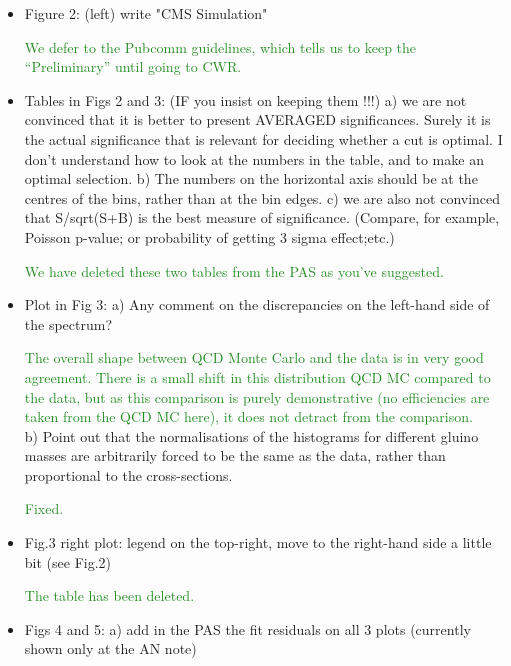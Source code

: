 \documentclass[paper=a4, fontsize=11pt]{scrartcl}
\begin{document}
\begin{itemize}
\item Figure 2: 
(left) write "CMS Simulation" 

\textcolor{ForestGreen}{We defer to the Pubcomm guidelines, which tells us to keep the ``Preliminary'' until
going to CWR.}\\


\item Tables in Figs 2 and 3: (IF you insist on keeping them !!!) 
a) we are not convinced that it is better to present AVERAGED significances. 
Surely it is the actual significance that is relevant for deciding whether 
a cut is optimal. I don't understand how to look at the numbers in the table, 
and to make an optimal selection. 
b) The numbers on the horizontal axis should be at the centres of the bins, 
rather than at the bin edges. 
c) we are also not convinced that S/sqrt(S+B) is the best measure of 
significance. (Compare, for example, Poisson p-value; or probability of 
getting 3 sigma effect;etc.) 

\textcolor{ForestGreen}{We have deleted these two tables from the PAS as you've suggested.}\\


\item Plot in Fig 3: 
a) Any comment on the discrepancies on the left-hand side of the spectrum? 

\textcolor{ForestGreen}{The overall shape between QCD Monte Carlo and the
data is in very good agreement. There is a small shift in this distribution
QCD MC compared to the data, but as this comparison is purely demonstrative
(no efficiencies are taken from the QCD MC here), it does not detract from
the comparison.}\\


b) Point out that the normalisations of the histograms for different gluino 
masses are arbitrarily forced to be the same as the data, rather than 
proportional to the cross-sections. 

\textcolor{ForestGreen}{Fixed.}\\


\item Fig.3 
right plot: legend on the top-right, move to the right-hand side a little 
bit (see Fig.2) 

\textcolor{ForestGreen}{The table has been deleted.}\\


\item Figs 4 and 5: 
a) add in the PAS the fit residuals on all 3 plots (currently shown only at 
the AN note) 


\end{itemize}
\end{document}
